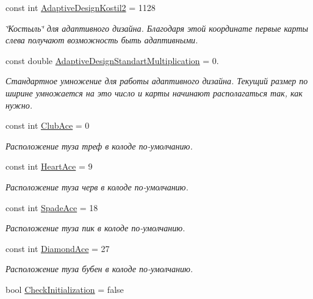 \begin{DoxyCompactItemize}
const int \hyperlink{class_pasyans_cover_u_w_p_1_1_game_page_a367926b010ff358ac0648ef18d176a7a}{Adaptive\+Design\+Kostil2} = 1128
\begin{DoxyCompactList}\small\item\em \char`\"{}Костыль\char`\"{} для адаптивного дизайна. Благодаря этой координате первые карты слева получают возможность быть адаптивными. \end{DoxyCompactList}\item 
const double \hyperlink{class_pasyans_cover_u_w_p_1_1_game_page_a00d87ca420d0de18549672216f60e196}{Adaptive\+Design\+Standart\+Multiplication} = 0.
\begin{DoxyCompactList}\small\item\em Стандартное умножение для работы адаптивного дизайна. Текущий размер по ширине умножается на это число и карты начинают располагаться так, как нужно. \end{DoxyCompactList}\item 
const int \hyperlink{class_pasyans_cover_u_w_p_1_1_game_page_a27a1a6eef955f572e3863062d33d2bc7}{Club\+Ace} = 0
\begin{DoxyCompactList}\small\item\em Расположение туза треф в колоде по-\/умолчанию. \end{DoxyCompactList}\item 
const int \hyperlink{class_pasyans_cover_u_w_p_1_1_game_page_a8214dbd1854ae65cd9f59b3f8246910b}{Heart\+Ace} = 9
\begin{DoxyCompactList}\small\item\em Расположение туза черв в колоде по-\/умолчанию. \end{DoxyCompactList}\item 
const int \hyperlink{class_pasyans_cover_u_w_p_1_1_game_page_afaebf6ffd47185bb4fa3b7a868eab00d}{Spade\+Ace} = 18
\begin{DoxyCompactList}\small\item\em Расположение туза пик в колоде по-\/умолчанию. \end{DoxyCompactList}\item 
const int \hyperlink{class_pasyans_cover_u_w_p_1_1_game_page_a086c2eca6aa451a0dd28f5dafc09cf46}{Diamond\+Ace} = 27
\begin{DoxyCompactList}\small\item\em Расположение туза бубен в колоде по-\/умолчанию. \end{DoxyCompactList}\item 
bool \hyperlink{class_pasyans_cover_u_w_p_1_1_game_page_ae00bab0ead88cf9738f730eb1ef7c055}{Check\+Initialization} = false

\end{DoxyCompactItemize}
